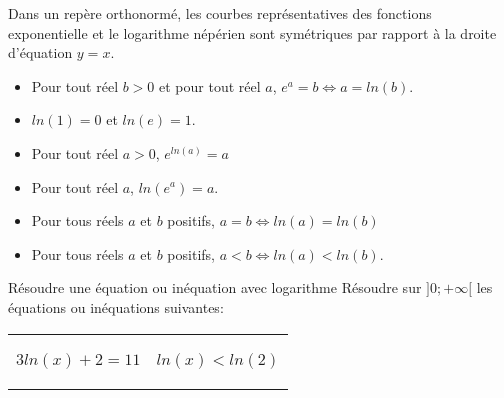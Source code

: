 \documentclass[a4paper]{article}
\begin{document}
\begin{propriete}{}{}
  Dans un repère orthonormé, les courbes représentatives des fonctions exponentielle et le logarithme népérien 
  sont symétriques par rapport à la droite d'équation $y=x$.

  \begin{center}
  \end{center}

  
\end{propriete}

\begin{propriete}{}{}
\begin{itemize}[label=\textbullet]
  \item Pour tout réel $b>0$ et pour tout réel $a$, $e^a=b \iff a=ln(b)$.
  \item $ln(1)=0$ et $ln(e)=1$.
  \item Pour tout réel $a>0$, $e^{ln(a)}=a$
  \item Pour tout réel $a$, $ln(e^a)=a$.
  \item Pour tous réels $a$ et $b$ positifs, $a=b \iff ln(a)=ln(b)$
  \item Pour tous réels $a$ et $b$ positifs, $a<b \iff ln(a)<ln(b)$. 
\end{itemize}
\end{propriete}

\begin{methode}{Résoudre une équation ou inéquation avec logarithme}{}
Résoudre sur $]0;+\infty[$ les équations ou inéquations suivantes:

\begin{tabular}{c|c}
  \begin{minipage}{8cm}
    \begin{center}
      
      $3ln(x)+2=11$
      \vspace{4cm}
    \end{center}
  \end{minipage}&
  \begin{minipage}{8cm}
    \begin{center}
      
  $ln(x)<ln(2)$
      \vspace{4cm}
    \end{center}
  \end{minipage}
\end{tabular}
\end{methode}
\end{document}
